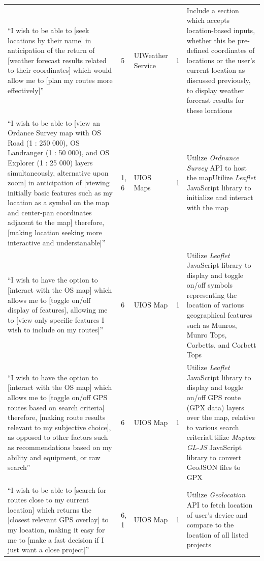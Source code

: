 \documentclass[11pt, english]{article}
\begin{document}
\begin{center}
\begin{longtable}{p{4cm}lp{1.5cm}lp{4cm}}
			``I wish to be able to [seek locations by their name] in anticipation of the return of [weather forecast results related to their coordinates] which would allow me to [plan my routes more effectively]'' & 5 & UI\newline Weather Service & 1 & Include a section which accepts location-based inputs, whether this be pre-defined coordinates of locations or the user's current location as discussed previously, to display weather forecast results for these locations\\
			``I wish to be able to [view an Ordance Survey map with OS Road (1 : 250 000), OS Landranger (1 : 50 000), and OS Explorer (1 : 25 000) layers simultaneously, alternative upon zoom] in anticipation of [viewing initially basic features such as my location as a symbol on the map and center-pan coordinates adjacent to the map] therefore, [making location seeking more interactive and understanable]'' & 1, 6 & UI\newline OS Maps & 1 & Utilize \textit{Ordnance Survey} API to host the map\newline Utilize \textit{Leaflet} JavaScript library to initialize and interact with the map\\
			``I wish to have the option to [interact with the OS map] which allows me to [toggle on/off display of features], allowing me to [view only specific features I wish to include on my routes]'' & 6 & UI\newline OS Map & 1 & Utilize \textit{Leaflet} JavaScript library to display and toggle on/off symbols representing the location of various geographical features such as Munros, Munro Tops, Corbetts, and Corbett Tops\\
			``I wish to have the option to [interact with the OS map] which allows me to [toggle on/off GPS routes based on search criteria] therefore, [making route results relevant to my subjective choice], as opposed to other factors such as recommendations based on my ability and equipment, or raw search'' & 6 & UI\newline OS Map & 1 & Utilize \textit{Leaflet} JavaScript library to display and toggle on/off GPS route (GPX data) layers over the map, relative to various search criteria\newline Utilize \textit{Mapbox GL-JS} JavaScript library to convert GeoJSON files to GPX\\
			``I wish to be able to [search for routes close to my current location] which returns the [closest relevant GPS overlay] to my location, making it easy for me to [make a fast decision if I just want a close project]'' & 6, 1 & UI\newline OS Map & 1 & Utilize \textit{Geolocation} API to fetch location of user's device and compare to the location of all listed projects\\

\end{longtable}
\end{center}
\end{document}
